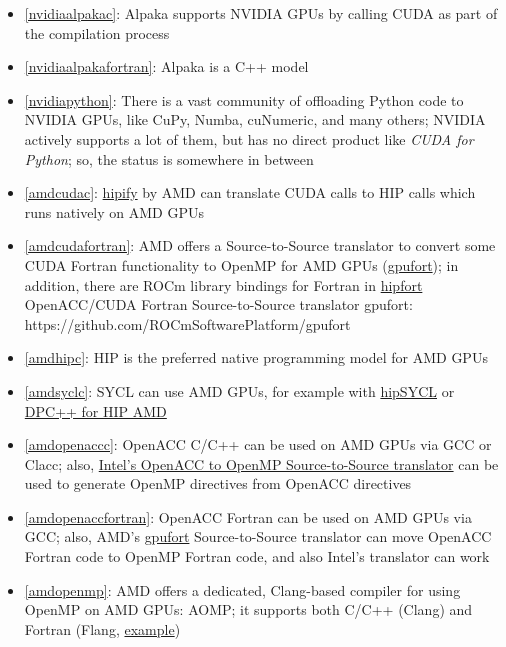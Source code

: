 \begin{itemize}
    \item \ref{nvidiaalpakac}: Alpaka supports NVIDIA GPUs by calling CUDA as part of the compilation process
    \item \ref{nvidiaalpakafortran}: Alpaka is a C++ model
    \item \ref{nvidiapython}: There is a vast community of offloading Python code to NVIDIA GPUs, like CuPy, Numba, cuNumeric, and many others; NVIDIA actively supports a lot of them, but has no direct product like \emph{CUDA for Python}; so, the status is somewhere in between
    \item \ref{amdcudac}: \href{github.com/ROCm-Developer-Tools/HIPIFY}{hipify} by AMD can translate CUDA calls to HIP calls which runs natively on AMD GPUs
    \item \ref{amdcudafortran}: AMD offers a Source-to-Source translator to convert some CUDA Fortran functionality to OpenMP for AMD GPUs (\href{https://github.com/ROCmSoftwarePlatform/gpufort}{gpufort}); in addition, there are ROCm library bindings for Fortran in \href{https://github.com/ROCmSoftwarePlatform/hipfort}{hipfort}
    OpenACC/CUDA Fortran Source-to-Source translator gpufort: https://github.com/ROCmSoftwarePlatform/gpufort
    \item \ref{amdhipc}: HIP is the preferred native programming model for AMD GPUs
    \item \ref{amdsyclc}: SYCL can use AMD GPUs, for example with \href{https://github.com/illuhad/hipSYCL}{hipSYCL} or \href{https://github.com/intel/llvm/blob/sycl/sycl/doc/GetStartedGuide.md\#build-dpc-toolchain-with-support-for-hip-amd}{DPC++ for HIP AMD}
    \item \ref{amdopenaccc}: OpenACC C/C++ can be used on AMD GPUs via GCC or Clacc; also, \href{https://github.com/intel/intel-application-migration-tool-for-openacc-to-openmp}{Intel's OpenACC to OpenMP Source-to-Source translator} can be used to generate OpenMP directives from OpenACC directives
    \item \ref{amdopenaccfortran}: OpenACC Fortran can be used on AMD GPUs via GCC; also, AMD's \href{https://github.com/intel/intel-application-migration-tool-for-openacc-to-openmp}{gpufort} Source-to-Source translator can move OpenACC Fortran code to OpenMP Fortran code, and also Intel's translator can work
    \item \ref{amdopenmp}: AMD offers a dedicated, Clang-based compiler for using OpenMP on AMD GPUs: AOMP; it supports both C/C++ (Clang) and Fortran (Flang, \href{https://github.com/ROCm-Developer-Tools/aomp/tree/aomp-dev/examples/fortran/simple_offload}{example})

\end{itemize}
